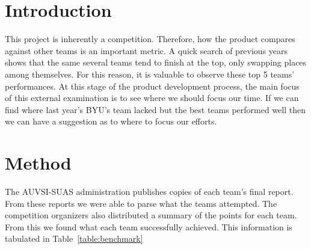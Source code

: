 \documentclass[]{auvsi_doc}
\begin{document}
\begin{AUVSITitlePage}
\begin{artifacttable}
\end{artifacttable}
\end{AUVSITitlePage}

\section{Introduction}

This project is inherently a competition. Therefore, how the product compares against other teams is an important metric.  A quick search of previous years shows that the same several teams tend to finish at the top, only swapping places among themselves. For this reason, it is valuable to observe these top 5 teams' performances. At this stage of the product development process, the main focus of this external examination is to see where we should focus our time. If we can find where last year's BYU's team lacked but the best teams performed well then we can have a suggestion as to where to focus our efforts.

\section{Method}
The AUVSI-SUAS administration publishes copies of each team's final report. From these reports we were able to parse what the teams attempted. The competition organizers also distributed a summary of the points for each team. From this we found what each team successfully achieved. This information is tabulated in Table~\ref{table:benchmark}
\end{document}
